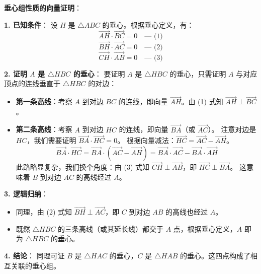 \begin{proofbox}
\textbf{垂心组性质的向量证明}：

\textbf{1. 已知条件}：
设 $H$ 是 $\triangle ABC$ 的垂心。根据垂心定义，有：
\[ \vec{AH} \cdot \vec{BC} = 0 \quad \text{--- (1)} \]
\[ \vec{BH} \cdot \vec{AC} = 0 \quad \text{--- (2)} \]
\[ \vec{CH} \cdot \vec{AB} = 0 \quad \text{--- (3)} \]

\textbf{2. 证明 $A$ 是 $\triangle HBC$ 的垂心}：
要证明 $A$ 是 $\triangle HBC$ 的垂心，只需证明 $A$ 与对应顶点的连线垂直于 $\triangle HBC$ 的对边：
\begin{itemize}
    \item \textbf{第一条高线}：考察 $A$ 到对边 $BC$ 的连线，即向量 $\vec{AH}$。由 (1) 式知 $\vec{AH} \perp \vec{BC}$。
    \item \textbf{第二条高线}：考察 $A$ 到对边 $HC$ 的连线，即向量 $\vec{BA}$（或 $\vec{AC}$）。
    注意对边是 $HC$，我们需要证明 $\vec{BA} \cdot \vec{HC} = 0$。
    根据向量减法：$\vec{HC} = \vec{AC} - \vec{AH}$。
    \[ \vec{BA} \cdot \vec{HC} = \vec{BA} \cdot (\vec{AC} - \vec{AH}) = \vec{BA} \cdot \vec{AC} - \vec{BA} \cdot \vec{AH} \]
    此路略显复杂，我们换个角度：由 (3) 式知 $\vec{CH} \perp \vec{AB}$，即 $\vec{HC} \perp \vec{BA}$。
    这意味着 $B$ 到对边 $AC$ 的高线经过 $A$。
\end{itemize}

\textbf{3. 逻辑归纳}：
\begin{itemize}
    \item 同理，由 (2) 式知 $\vec{BH} \perp \vec{AC}$，即 $C$ 到对边 $AB$ 的高线也经过 $A$。
    \item 既然 $\triangle HBC$ 的三条高线（或其延长线）都交于 $A$ 点，根据垂心定义，$A$ 即为 $\triangle HBC$ 的垂心。
\end{itemize}

\textbf{4. 结论}：
同理可证 $B$ 是 $\triangle HAC$ 的垂心，$C$ 是 $\triangle HAB$ 的垂心。这四点构成了相互关联的垂心组。
\end{proofbox}